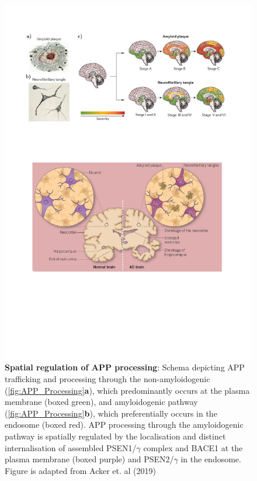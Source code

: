 \begin{figure}[!htp]
	\centering
	\includegraphics[page=6,trim={0 8cm 0cm 0cm},clip, scale = 0.8]{Figures/Introduction_Figures.pdf}
	\captionsetup{width=0.95\textwidth,singlelinecheck=off}
	\caption[Spatial regulation of APP trafficking and processing]%
	{\textbf{Spatial regulation of APP processing}: Schema depicting APP trafficking and processing through the non-amyloidogenic (\cref{fig:APP_Processing}\textbf{a}), which predominantly occurs at the plasma membrane (boxed green), and amyloidogenic pathway (\cref{fig:APP_Processing}\textbf{b}), which preferentially occurs in the endosome (boxed red). APP processing through the amyloidogenic pathway is spatially regulated by the localisation and distinct internalisation of assembled PSEN1/$\gamma$ complex and BACE1 at the plasma membrane (boxed purple) and PSEN2/$\gamma$ in the endosome. Figure is adapted from Acker et. al (2019)\cite{Acker2019}  
	}
	\label{fig:APP_Trafficking}
\end{figure}



